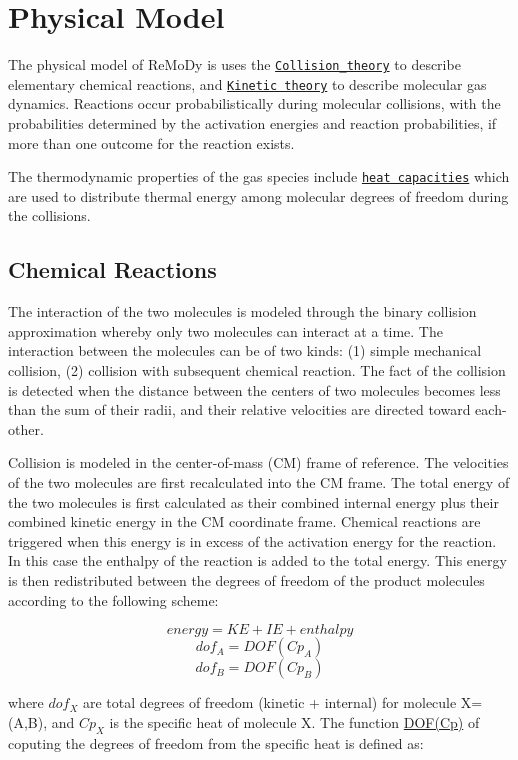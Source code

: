 \hypertarget{Model_SecModel}{}\section{Physical Model}\label{Model_SecModel}
The physical model of ReMoDy is uses the \href{http://en.wikipedia.org/wiki/Collision_theory}{\tt Collision\_\-theory} to describe elementary chemical reactions, and \href{http://en.wikipedia.org/wiki/Kinetic_theory}{\tt Kinetic theory} to describe molecular gas dynamics. Reactions occur probabilistically during molecular collisions, with the probabilities determined by the activation energies and reaction probabilities, if more than one outcome for the reaction exists.

The thermodynamic properties of the gas species include \href{http://en.wikipedia.org/wiki/Heat_capacity}{\tt heat capacities} which are used to distribute thermal energy among molecular degrees of freedom during the collisions.\hypertarget{Model_SReact}{}\subsection{Chemical Reactions}\label{Model_SReact}
The interaction of the two molecules is modeled through the binary collision approximation whereby only two molecules can interact at a time. The interaction between the molecules can be of two kinds: (1) simple mechanical collision, (2) collision with subsequent chemical reaction. The fact of the collision is detected when the distance between the centers of two molecules becomes less than the sum of their radii, and their relative velocities are directed toward each-other.

Collision is modeled in the center-of-mass (CM) frame of reference. The velocities of the two molecules are first recalculated into the CM frame. The total energy of the two molecules is first calculated as their combined internal energy plus their combined kinetic energy in the CM coordinate frame. Chemical reactions are triggered when this energy is in excess of the activation energy for the reaction. In this case the enthalpy of the reaction is added to the total energy. This energy is then redistributed between the degrees of freedom of the product molecules according to the following scheme:

\[ energy = KE + IE + enthalpy \] \[ dof_A = DOF(Cp_A) \] \[ dof_B = DOF(Cp_B) \]

where $dof_X$ are total degrees of freedom (kinetic + internal) for molecule X=(A,B), and $Cp_X$ is the specific heat of molecule X. The function \hyperlink{def_8h_209720e83dae866cf7ca0973c6fc074a}{DOF(Cp)} of coputing the degrees of freedom from the specific heat is defined as:

